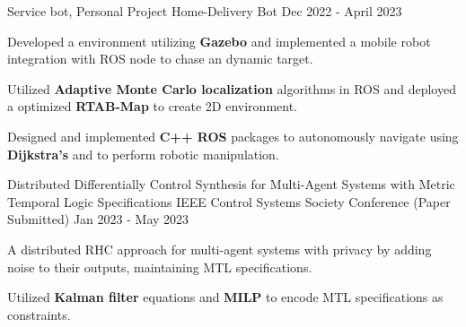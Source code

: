 



\begin{cventries}


  \cventry
    {Service bot, Personal Project} %
    {Home-Delivery Bot} %
    {Dec 2022 - April 2023} %
    {} %
    {
      \begin{cvitems} %
        \item {Developed a environment utilizing {\bf Gazebo} and implemented a mobile robot integration with ROS node to chase an dynamic target.}
        \item {Utilized {\bf Adaptive Monte Carlo localization} algorithms in ROS and deployed a optimized {\bf RTAB-Map} to create 2D environment.}
        \item {Designed and implemented {\bf C++ ROS} packages to autonomously navigate using {\bf Dijkstra's} and to perform robotic manipulation.}    
      \end{cvitems}
    }
    

  \cventry
    {Distributed Differentially Control Synthesis for Multi-Agent Systems with Metric Temporal Logic Specifications} %
    {IEEE Control Systems Society Conference (Paper Submitted)} %
    {Jan 2023 - May 2023} %
    {} %
    {
      \begin{cvitems} %
        \item {A distributed RHC approach for multi-agent systems with privacy by adding noise to their outputs, maintaining MTL specifications.}
        \item{Utilized {\bf Kalman filter} equations and {\bf MILP} to encode MTL specifications as constraints.}
      \end{cvitems}
    }



\end{cventries}
